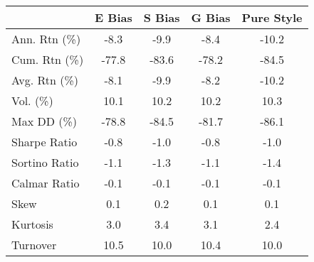 \begin{tabular}{lcccc}
\toprule
 & E Bias & S Bias & G Bias & Pure Style \\
\midrule
Ann. Rtn (\%) & -8.3 & -9.9 & -8.4 & -10.2 \\
Cum. Rtn (\%) & -77.8 & -83.6 & -78.2 & -84.5 \\
Avg. Rtn (\%) & -8.1 & -9.9 & -8.2 & -10.2 \\
Vol. (\%) & 10.1 & 10.2 & 10.2 & 10.3 \\
Max DD (\%) & -78.8 & -84.5 & -81.7 & -86.1 \\
Sharpe Ratio & -0.8 & -1.0 & -0.8 & -1.0 \\
Sortino Ratio & -1.1 & -1.3 & -1.1 & -1.4 \\
Calmar Ratio & -0.1 & -0.1 & -0.1 & -0.1 \\
Skew & 0.1 & 0.2 & 0.1 & 0.1 \\
Kurtosis & 3.0 & 3.4 & 3.1 & 2.4 \\
Turnover & 10.5 & 10.0 & 10.4 & 10.0 \\
\bottomrule
\end{tabular}
